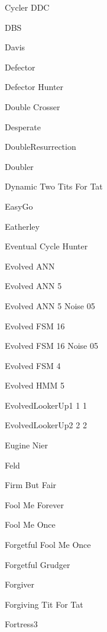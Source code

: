 \item Cycler DDC~\cite{Mittal2009}
\item DBS~\cite{Au2006}
\item Davis~\cite{Axelrod1980a}
\item Defector~\cite{Axelrod1981, Mittal2009, Press2012}
\item Defector Hunter~\cite{axelrodproject}
\item Double Crosser~\cite{axelrodproject}
\item Desperate \cite{Van2015}
\item DoubleResurrection~\cite{Eckhart2015}
\item Doubler~\cite{prison}
\item Dynamic Two Tits For Tat~\cite{axelrodproject}
\item EasyGo~\cite{Li2011, prison}
\item Eatherley~\cite{Axelrod1980b}
\item Eventual Cycle Hunter~\cite{axelrodproject}
\item Evolved ANN~\cite{axelrodproject}
\item Evolved ANN 5~\cite{axelrodproject}
\item Evolved ANN 5 Noise 05~\cite{axelrodproject}
\item Evolved FSM 16~\cite{axelrodproject}
\item Evolved FSM 16 Noise 05~\cite{axelrodproject}
\item Evolved FSM 4~\cite{axelrodproject}
\item Evolved HMM 5~\cite{axelrodproject}
\item EvolvedLookerUp1 1 1~\cite{axelrodproject}
\item EvolvedLookerUp2 2 2~\cite{axelrodproject}
\item Eugine Nier~\cite{lesswrong}
\item Feld~\cite{Axelrod1980a}
\item Firm But Fair~\cite{Frean1994}
\item Fool Me Forever~\cite{axelrodproject}
\item Fool Me Once~\cite{axelrodproject}
\item Forgetful Fool Me Once~\cite{axelrodproject}
\item Forgetful Grudger~\cite{axelrodproject}
\item Forgiver~\cite{axelrodproject}
\item Forgiving Tit For Tat~\cite{axelrodproject}
\item Fortress3~\cite{Ashlock2006}
